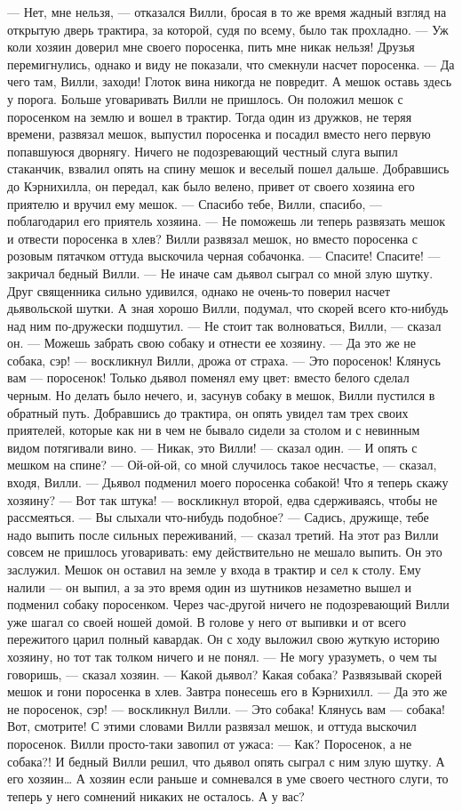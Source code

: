 — Нет, мне нельзя, — отказался Вилли, бросая в то же время жадный взгляд на открытую дверь трактира, за которой, судя по всему, было так прохладно. — Уж коли хозяин доверил мне своего поросенка, пить мне никак нельзя!
Друзья перемигнулись, однако и виду не показали, что смекнули насчет поросенка.
— Да чего там, Вилли, заходи! Глоток вина никогда не повредит. А мешок оставь здесь у порога.
Больше уговаривать Вилли не пришлось. Он положил мешок с поросенком на землю и вошел в трактир. Тогда один из дружков, не теряя времени, развязал мешок, выпустил поросенка и посадил вместо него первую попавшуюся дворнягу.
Ничего не подозревающий честный слуга выпил стаканчик, взвалил опять на спину мешок и веселый пошел дальше. Добравшись до Кэрнихилла, он передал, как было велено, привет от своего хозяина его приятелю и вручил ему мешок.
— Спасибо тебе, Вилли, спасибо, — поблагодарил его приятель хозяина. — Не поможешь ли теперь развязать мешок и отвести поросенка в хлев?
Вилли развязал мешок, но вместо поросенка с розовым пятачком оттуда выскочила черная собачонка.
— Спасите! Спасите! — закричал бедный Вилли. — Не иначе сам дьявол сыграл со мной злую шутку.
Друг священника сильно удивился, однако не очень-то поверил насчет дьявольской шутки. А зная хорошо Вилли, подумал, что скорей всего кто-нибудь над ним по-дружески подшутил.
— Не стоит так волноваться, Вилли, — сказал он. — Можешь забрать свою собаку и отнести ее хозяину.
— Да это же не собака, сэр! — воскликнул Вилли, дрожа от страха. — Это поросенок! Клянусь вам — поросенок! Только дьявол поменял ему цвет: вместо белого сделал черным.
Но делать было нечего, и, засунув собаку в мешок, Вилли пустился в обратный путь. Добравшись до трактира, он опять увидел там трех своих приятелей, которые как ни в чем не бывало сидели за столом и с невинным видом потягивали вино.
— Никак, это Вилли! — сказал один. — И опять с мешком на спине?
— Ой-ой-ой, со мной случилось такое несчастье, — сказал, входя, Вилли. — Дьявол подменил моего поросенка собакой! Что я теперь скажу хозяину?
— Вот так штука! — воскликнул второй, едва сдерживаясь, чтобы не рассмеяться. — Вы слыхали что-нибудь подобное?
— Садись, дружище, тебе надо выпить после сильных переживаний, — сказал третий.
На этот раз Вилли совсем не пришлось уговаривать: ему действительно не мешало выпить. Он это заслужил.
Мешок он оставил на земле у входа в трактир и сел к столу. Ему налили — он выпил, а за это время один из шутников незаметно вышел и подменил собаку поросенком.
Через час-другой ничего не подозревающий Вилли уже шагал со своей ношей домой. В голове у него от выпивки и от всего пережитого царил полный кавардак. Он с ходу выложил свою жуткую историю хозяину, но тот так толком ничего и не понял.
— Не могу уразуметь, о чем ты говоришь, — сказал хозяин. — Какой дьявол? Какая собака? Развязывай скорей мешок и гони поросенка в хлев. Завтра понесешь его в Кэрнихилл.
— Да это же не поросенок, сэр! — воскликнул Вилли. — Это собака! Клянусь вам — собака! Вот, смотрите!
С этими словами Вилли развязал мешок, и оттуда выскочил поросенок. Вилли просто-таки завопил от ужаса:
— Как? Поросенок, а не собака?!
И бедный Вилли решил, что дьявол опять сыграл с ним злую шутку. А его хозяин…
А хозяин если раньше и сомневался в уме своего честного слуги, то теперь у него сомнений никаких не осталось.
А у вас?


